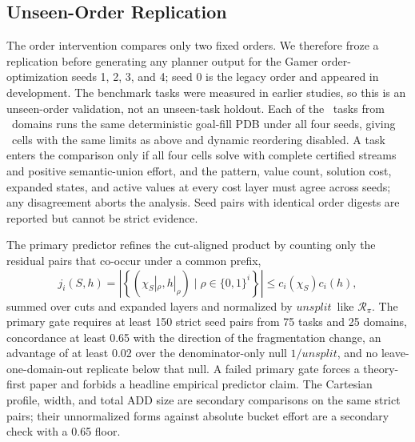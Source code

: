 \documentclass[letterpaper]{article}
\newcommand{\cutcount}[2]{\ensuremath{c_{#1}(#2)}}
\newcommand{\unioneffort}{\ensuremath{\mathit{unsplit}}}
\newcommand{\profilescore}{\ensuremath{\mathcal{R}_{\pi}}}
\theoremstyle{plain}
\theoremstyle{definition}
\theoremstyle{remark}
\begin{document}
\FloatBarrier
\subsection{Unseen-Order Replication}

The order intervention compares only two fixed orders.  We therefore froze a
replication before generating any planner output for the Gamer
order-optimization seeds 1, 2, 3, and 4; seed 0 is the legacy order and
appeared in development.  The benchmark tasks were measured in earlier
studies, so this is an unseen-order validation, not an unseen-task holdout.
Each of the \SeedValidationTasks\ tasks from \SeedValidationDomains\ domains
runs the same deterministic goal-fill PDB under all four seeds, giving
\SeedValidationCells\ cells with the same limits as above and dynamic
reordering disabled.  A task enters the comparison only if all four cells
solve with complete certified streams and positive semantic-union effort, and
the pattern, value count, solution cost, expanded states, and active values at
every cost layer must agree across seeds; any disagreement aborts the
analysis.  Seed pairs with identical order digests are reported but cannot be
strict evidence.

The primary predictor refines the cut-aligned product by counting only the
residual pairs that co-occur under a common prefix,
\[
 j_i(S,h)=\left|\left\{(\chi_S|_\rho,h|_\rho)\mid\rho\in\{0,1\}^i\right\}\right|
 \leq\cutcount{i}{\chi_S}\cutcount{i}{h},
\]
summed over cuts and expanded layers and normalized by \unioneffort\ like
$\profilescore$.  The primary gate requires at least 150 strict seed pairs from
75 tasks and 25 domains, concordance at least 0.65 with the direction of the
fragmentation change, an advantage of at least 0.02 over the denominator-only
null $1/\unioneffort$, and no leave-one-domain-out replicate below that null.
A failed primary gate forces a theory-first paper and forbids a headline
empirical predictor claim.  The Cartesian profile, width, and total ADD size
are secondary comparisons on the same strict pairs; their unnormalized forms
against absolute bucket effort are a secondary check with a 0.65 floor.
\end{document}
